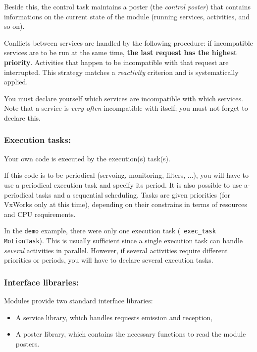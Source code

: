 Beside    this, the control task  maintains   a poster  (the {\em control
poster}) that contains informations on   the current state of the  module
(running services, activities, and so on).

Conflicts between services are   handled  by the following  procedure:  if
incompatible  services are to  be run  at the  same  time, {\bf  the last
request   has  the  highest  priority}. Activities    that  happen to  be
incompatible  with that request are  interrupted. This strategy matches a
{\em reactivity} criterion and is systematically applied.

You must  declare  yourself which  services  are incompatible with  which
services. Note that   a service is  {\em  very often}  incompatible  with
itself; you must not forget to declare this.


\subsubsection{Execution tasks:}

Your own code is executed by the execution(s) task(s).

If  this code is to  be periodical (servoing,  monitoring, filters, ...),
you will have to use a periodical  execution task and specify its period.
It   is  also  possible   to use   a-periodical  tasks  and  a  sequential
scheduling. Tasks are  given priorities (for  VxWorks only at this time),
depending on their constrains in terms of resources and CPU requirements.

In the  {\tt  demo} example,  there were  only one  execution  task ({\tt
exec\_task MotionTask}). This   is  usually  sufficient since  a   single
execution task can handle {\em several}  activities in parallel. However,
if several  activities require different  priorities or periods, you will
have to declare several execution tasks.


\subsubsection{Interface libraries:}

Modules provide two standard interface libraries:

\begin{itemize}
\item A service library, which handles requests emission and reception,
\item A poster library, which contains the necessary functions to read
the module posters.
\end{itemize}


